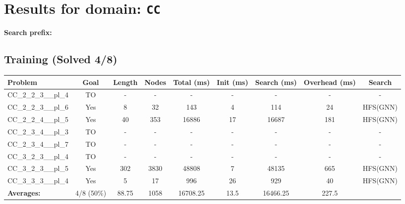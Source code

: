 \documentclass{article}
\begin{document}
\section*{Results for domain: \texttt{CC}}
\textbf{Search prefix:} 
\\[0.5cm]
\subsection*{Training (Solved 4/8)}
\begin{tabular}{lcccccccc}
\toprule
Problem & Goal & Length & Nodes & Total (ms) & Init (ms) & Search (ms) & Overhead (ms) & Search \\
\midrule
CC\_2\_2\_3\_\_pl\_4 & TO & - & - & - & - & - & - & - \\
CC\_2\_2\_3\_\_pl\_6 & Yes & 8 & 32 & 143 & 4 & 114 & 24 & HFS(GNN) \\
CC\_2\_2\_4\_\_pl\_5 & Yes & 40 & 353 & 16886 & 17 & 16687 & 181 & HFS(GNN) \\
CC\_2\_3\_4\_\_pl\_3 & TO & - & - & - & - & - & - & - \\
CC\_2\_3\_4\_\_pl\_7 & TO & - & - & - & - & - & - & - \\
CC\_3\_2\_3\_\_pl\_4 & TO & - & - & - & - & - & - & - \\
CC\_3\_2\_3\_\_pl\_5 & Yes & 302 & 3830 & 48808 & 7 & 48135 & 665 & HFS(GNN) \\
CC\_3\_3\_3\_\_pl\_4 & Yes & 5 & 17 & 996 & 26 & 929 & 40 & HFS(GNN) \\
\textbf{Averages:} & 4/8 (50\%) & 88.75 & 1058 & 16708.25 & 13.5 & 16466.25 & 227.5 & \\
\bottomrule
\end{tabular}
\\[0.7cm]
\end{document}
